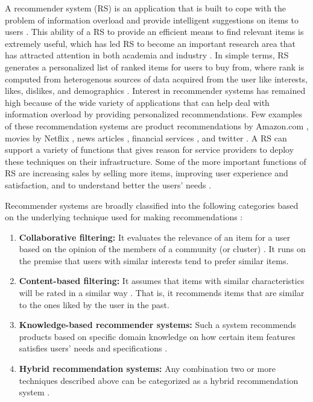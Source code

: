 \documentclass[12pt]{article}
\begin{document}
A recommender system (RS) is an application that is built to cope with the problem of information overload and provide intelligent suggestions on items to users \cite{ricci,recommender systems.html}. This ability of a RS to provide an efficient means to find relevant items is extremely useful, which has led RS to become an important research area that has attracted attention in both academia and industry \cite{adomavicius-2005}. In simple terms, RS generates a personalized list of ranked items for users to buy from, where rank is computed from heterogenous sources of data acquired from the user like interests, likes, dislikes, and demographics \cite{ricci}. Interest in recommender systems has remained high because of the wide variety of applications that can help deal with information overload by providing personalized recommendations. Few examples of these recommendation systems are product recommendations by Amazon.com \cite{linden}, movies by Netflix \cite{amatriain}, news articles \cite{nanas}, financial services \cite{felfernig}, and twitter \cite{gupta}. A RS can support a variety of functions that gives reason for service providers to deploy these techniques on their infrastructure. Some of the more important functions of RS are increasing sales by selling more items, improving user experience and satisfaction, and to understand better the users' needs \cite{ricci}.

Recommender systems are broadly classified into the following categories based on the underlying technique used for making recommendations \cite{adomavicius-2005,burke,jannach}:

\begin{enumerate}
\item \textbf{Collaborative filtering:} It evaluates the relevance of an item for a user based on the opinion of the members of a community (or cluster) \cite{nanas}. It runs on the premise that users with similar interests tend to prefer similar items.
\item \textbf{Content-based filtering:} It assumes that items with similar characteristics will be rated in a similar way \cite{wu}. That is, it recommends items that are similar to the ones liked by the user in the past.
\item \textbf{Knowledge-based recommender systems:} Such a system recommends products based on specific domain knowledge on how certain item features satisfies users' needs and specifications \cite{ricci}. 
\item \textbf{Hybrid recommendation systems:} Any combination two or more techniques described above can be categorized as a hybrid recommendation system \cite{jannach}.
\end{enumerate}
\end{document}
